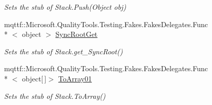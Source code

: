 \begin{DoxyCompactItemize}
\begin{DoxyCompactList}\small\item\em Sets the stub of Stack.\-Push(\-Object obj)\end{DoxyCompactList}\item 
mqttf\-::\-Microsoft.\-Quality\-Tools.\-Testing.\-Fakes.\-Fakes\-Delegates.\-Func\\*
$<$ object $>$ \hyperlink{class_system_1_1_collections_1_1_fakes_1_1_stub_stack_af4d10b13d7049ff72a5dc292c3f8bb1f}{Sync\-Root\-Get}
\begin{DoxyCompactList}\small\item\em Sets the stub of Stack.\-get\-\_\-\-Sync\-Root()\end{DoxyCompactList}\item 
mqttf\-::\-Microsoft.\-Quality\-Tools.\-Testing.\-Fakes.\-Fakes\-Delegates.\-Func\\*
$<$ object\mbox{[}$\,$\mbox{]}$>$ \hyperlink{class_system_1_1_collections_1_1_fakes_1_1_stub_stack_aa2effab4f696d814f50a5c486bc6d05c}{To\-Array01}
\begin{DoxyCompactList}\small\item\em Sets the stub of Stack.\-To\-Array()\end{DoxyCompactList}\end{DoxyCompactItemize}
